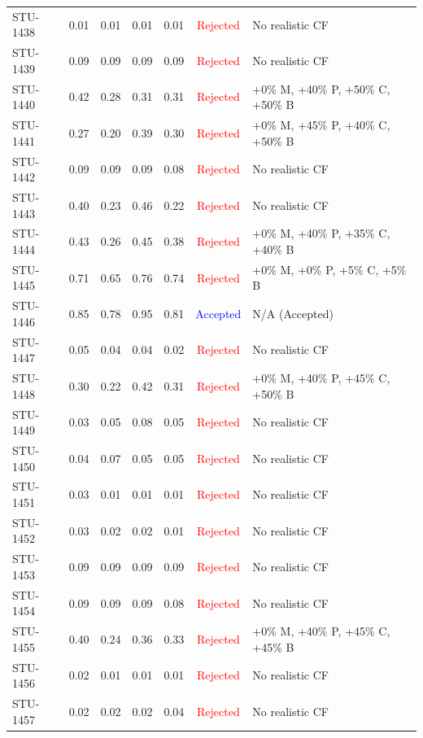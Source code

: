 \begin{longtable}{l c c c c | c | l}
STU-1438 & 0.01 & 0.01 & 0.01 & 0.01 & \textcolor{red}{Rejected} & No realistic CF \\
STU-1439 & 0.09 & 0.09 & 0.09 & 0.09 & \textcolor{red}{Rejected} & No realistic CF \\
STU-1440 & 0.42 & 0.28 & 0.31 & 0.31 & \textcolor{red}{Rejected} & +0\% M, +40\% P, +50\% C, +50\% B \\
STU-1441 & 0.27 & 0.20 & 0.39 & 0.30 & \textcolor{red}{Rejected} & +0\% M, +45\% P, +40\% C, +50\% B \\
STU-1442 & 0.09 & 0.09 & 0.09 & 0.08 & \textcolor{red}{Rejected} & No realistic CF \\
STU-1443 & 0.40 & 0.23 & 0.46 & 0.22 & \textcolor{red}{Rejected} & No realistic CF \\
STU-1444 & 0.43 & 0.26 & 0.45 & 0.38 & \textcolor{red}{Rejected} & +0\% M, +40\% P, +35\% C, +40\% B \\
STU-1445 & 0.71 & 0.65 & 0.76 & 0.74 & \textcolor{red}{Rejected} & +0\% M, +0\% P, +5\% C, +5\% B \\
STU-1446 & 0.85 & 0.78 & 0.95 & 0.81 & \textcolor{blue}{Accepted} & N/A (Accepted) \\
STU-1447 & 0.05 & 0.04 & 0.04 & 0.02 & \textcolor{red}{Rejected} & No realistic CF \\
STU-1448 & 0.30 & 0.22 & 0.42 & 0.31 & \textcolor{red}{Rejected} & +0\% M, +40\% P, +45\% C, +50\% B \\
STU-1449 & 0.03 & 0.05 & 0.08 & 0.05 & \textcolor{red}{Rejected} & No realistic CF \\
STU-1450 & 0.04 & 0.07 & 0.05 & 0.05 & \textcolor{red}{Rejected} & No realistic CF \\
STU-1451 & 0.03 & 0.01 & 0.01 & 0.01 & \textcolor{red}{Rejected} & No realistic CF \\
STU-1452 & 0.03 & 0.02 & 0.02 & 0.01 & \textcolor{red}{Rejected} & No realistic CF \\
STU-1453 & 0.09 & 0.09 & 0.09 & 0.09 & \textcolor{red}{Rejected} & No realistic CF \\
STU-1454 & 0.09 & 0.09 & 0.09 & 0.08 & \textcolor{red}{Rejected} & No realistic CF \\
STU-1455 & 0.40 & 0.24 & 0.36 & 0.33 & \textcolor{red}{Rejected} & +0\% M, +40\% P, +45\% C, +45\% B \\
STU-1456 & 0.02 & 0.01 & 0.01 & 0.01 & \textcolor{red}{Rejected} & No realistic CF \\
STU-1457 & 0.02 & 0.02 & 0.02 & 0.04 & \textcolor{red}{Rejected} & No realistic CF \\

\end{longtable}
